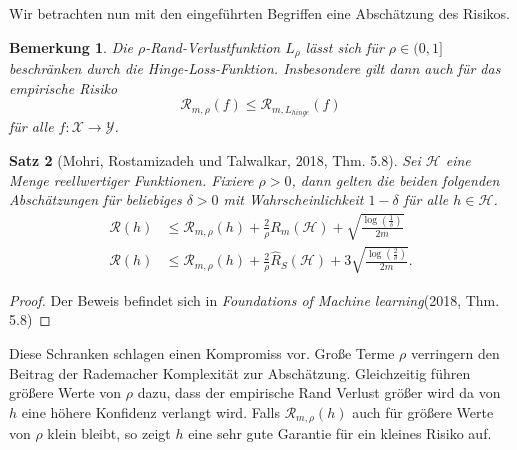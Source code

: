 \documentclass{article}
\theoremstyle{plain}
\newtheorem{thm}{Satz}[subsection]
\newtheorem{bem}[thm]{Bemerkung}
\theoremstyle{definition}
\begin{document}
    Wir betrachten nun mit den eingeführten Begriffen eine Abschätzung des Risikos.
    
    \begin{bem} \label{bem:margin_loss_leq_hinge_loss}
        Die $\rho$-Rand-Verlustfunktion $L_{\rho}$ lässt sich für $\rho \in (0,1]$ beschränken durch die Hinge-Loss-Funktion. Insbesondere gilt dann auch für das empirische Risiko
        \[
            \mathcal{R}_{m,\rho}(f) \leq \mathcal{R}_{m,L_{hinge}}(f)
        \]
        für alle $f: \mathcal{X} \to \mathcal{Y}$.
    \end{bem}
    
    \begin{thm}[Mohri, Rostamizadeh und Talwalkar, 2018, Thm. 5.8]
        Sei $\mathcal{H}$ eine Menge reellwertiger Funktionen. Fixiere $\rho > 0$, dann gelten die beiden folgenden Abschätzungen für beliebiges $\delta > 0$ mit Wahrscheinlichkeit $1 - \delta$ für alle $h \in \mathcal{H}$.
        \[
            \begin{split}
            \mathcal{R}(h) &\leq \mathcal{R}_{m, \rho}(h) + \frac{2}{\rho} R_{m}(\mathcal{H}) + \sqrt{\frac{\log(\frac{1}{\delta})}{2 m}} \\
            \mathcal{R}(h) &\leq \mathcal{R}_{m, \rho}(h) + \frac{2}{\rho} \hat{R}_{S}(\mathcal{H}) + 3 \sqrt{\frac{\log(\frac{2}{\delta})}{2 m}}.
            \end{split}
        \]
    \end{thm}
    \begin{proof}
        Der Beweis befindet sich in \textit{Foundations of Machine learning}(2018, Thm. 5.8)\cite{foundations}
    \end{proof}
    
    Diese Schranken schlagen einen Kompromiss vor. Große Terme $\rho$ verringern den Beitrag der Rademacher Komplexität zur Abschätzung. Gleichzeitig führen größere Werte von $\rho$ dazu, dass der empirische Rand Verlust größer wird da von $h$ eine höhere Konfidenz verlangt wird. Falls $\mathcal{R}_{m, \rho}(h)$ auch für größere Werte von $\rho$ klein bleibt, so zeigt $h$ eine sehr gute Garantie für ein kleines Risiko auf.
    
\end{document}
